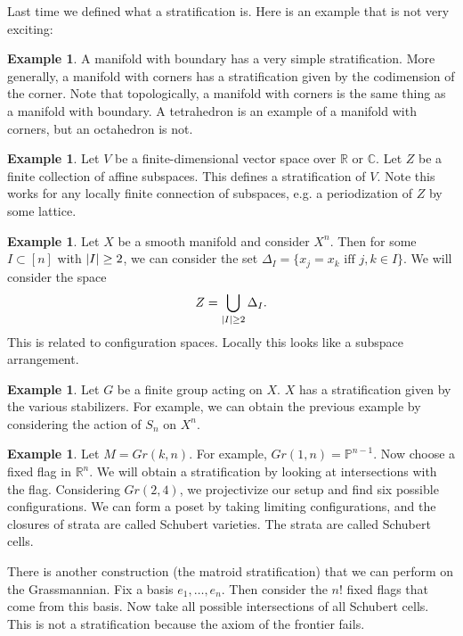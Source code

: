 \documentclass[leqno, openany]{memoir}
\theoremstyle{definition}
\newtheorem{exm}[thm]{Example}
\theoremstyle{remark}
\theoremstyle{plain}
\theoremstyle{definition}
\theoremstyle{remark}
\newcommand{\R}{\mathbb{R}}
\newcommand{\C}{\mathbb{C}}
\renewcommand{\P}{\mathbb{P}}
\begin{document}
Last time we defined what a stratification is. Here is an example that is not very exciting:

\begin{exm}
    A manifold with boundary has a very simple stratification. More generally, a manifold with corners has a stratification given by the codimension of the corner. Note that topologically, a manifold with corners is the same thing as a manifold with boundary. A tetrahedron is an example of a manifold with corners, but an octahedron is not.
\end{exm}

\begin{exm}
    Let $V$ be a finite-dimensional vector space over $\R$ or $\C$. Let $Z$ be a finite collection of affine subspaces. This defines a stratification of $V$. Note this works for any locally finite connection of subspaces, e.g. a periodization of $Z$ by some lattice.
\end{exm}

\begin{exm}
    Let $X$ be a smooth manifold and consider $X^n$. Then for some $I \subset [n]$ with $\abs{I} \geq 2$, we can consider the set $\Delta_I = \{ x_j = x_k \text{ iff } j,k \in I \}$. We will consider the space
    \[ Z = \bigcup_{\abs{I} \geq 2} \Delta_I.\]
    This is related to configuration spaces. Locally this looks like a subspace arrangement.
\end{exm}

\begin{exm}
    Let $G$ be a finite group acting on $X$. $X$ has a stratification given by the various stabilizers. For example, we can obtain the previous example by considering the action of $S_n$ on $X^n$.
\end{exm}

\begin{exm}
    Let $M = Gr(k,n)$. For example, $Gr(1,n) = \P^{n-1}$. Now choose a fixed flag in $\R^n$. We will obtain a stratification by looking at intersections with the flag. Considering $Gr(2,4)$, we projectivize our setup and find six possible configurations. We can form a poset by taking limiting configurations, and the closures of strata are called Schubert varieties. The strata are called Schubert cells.

    There is another construction (the matroid stratification) that we can perform on the Grassmannian. Fix a basis $e_1, \ldots, e_n$. Then consider the $n!$ fixed flags that come from this basis. Now take all possible intersections of all Schubert cells. This is not a stratification because the axiom of the frontier fails.
\end{exm}
\end{document}
